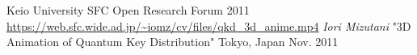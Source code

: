 \begin{cventries}
  \cventry
    {Keio University SFC Open Research Forum 2011 \url{https://web.sfc.wide.ad.jp/~iomz/cv/files/qkd_3d_anime.mp4}} %
    {{\fontsize{8pt}{1em}\bodyfont\slshape\color{graytext} Iori Mizutani} "3D Animation of Quantum Key Distribution"} %
    {Tokyo, Japan} %
    {Nov. 2011} %
    {
      \begin{cvitems}
      \end{cvitems}
    }

\end{cventries}
